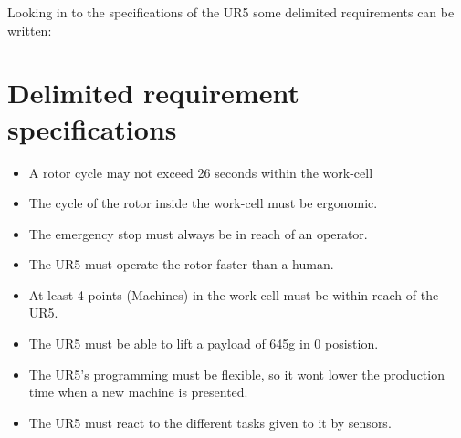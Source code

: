Looking in to the specifications of the UR5 some delimited requirements can be written:\\
 



\section{Delimited requirement specifications}

\begin{itemize}
    \item A rotor cycle may not exceed 26 seconds within the work-cell
    \item The cycle of the rotor inside the work-cell must be ergonomic.
    \item The emergency stop must always be in reach of an operator.
    \item The UR5 must operate the rotor faster than a human.
    \item At least 4 points (Machines) in the work-cell must be within reach of the UR5.
    \item The UR5 must be able to lift a payload of 645g in 0 posistion.
    \item The UR5's programming must be flexible, so it wont lower the production time when a new machine is presented.
    \item The UR5 must react to the different tasks given to it by sensors.
\end{itemize}